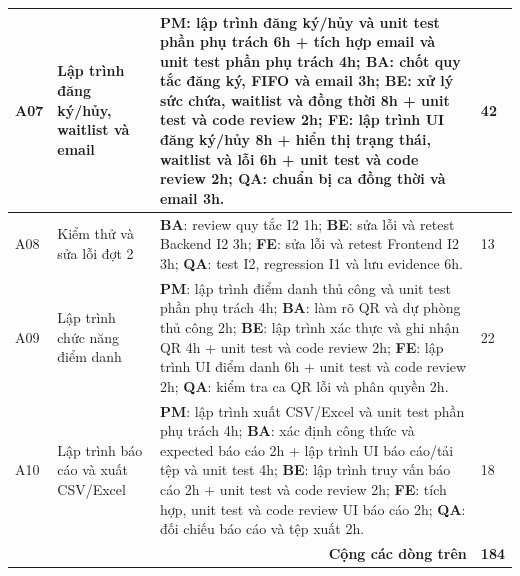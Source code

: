 \documentclass{article}
\begin{document}
\begin{landscape}
\begin{table}[H]
\begin{tabularx}{\linewidth}{|p{1.1cm}|p{5.3cm}|>{\raggedright\arraybackslash}X|p{1.25cm}|}
A07 & Lập trình đăng ký/hủy, waitlist và email & \textbf{PM}: lập trình đăng ký/hủy và unit test phần phụ trách 6h + tích hợp email và unit test phần phụ trách 4h; \textbf{BA}: chốt quy tắc đăng ký, FIFO và email 3h; \textbf{BE}: xử lý sức chứa, waitlist và đồng thời 8h + unit test và code review 2h; \textbf{FE}: lập trình UI đăng ký/hủy 8h + hiển thị trạng thái, waitlist và lỗi 6h + unit test và code review 2h; \textbf{QA}: chuẩn bị ca đồng thời và email 3h. & 42 \\ \hline
A08 & Kiểm thử và sửa lỗi đợt 2 & \textbf{BA}: review quy tắc I2 1h; \textbf{BE}: sửa lỗi và retest Backend I2 3h; \textbf{FE}: sửa lỗi và retest Frontend I2 3h; \textbf{QA}: test I2, regression I1 và lưu evidence 6h. & 13 \\ \hline
A09 & Lập trình chức năng điểm danh & \textbf{PM}: lập trình điểm danh thủ công và unit test phần phụ trách 4h; \textbf{BA}: làm rõ QR và dự phòng thủ công 2h; \textbf{BE}: lập trình xác thực và ghi nhận QR 4h + unit test và code review 2h; \textbf{FE}: lập trình UI điểm danh 6h + unit test và code review 2h; \textbf{QA}: kiểm tra ca QR lỗi và phân quyền 2h. & 22 \\ \hline
A10 & Lập trình báo cáo và xuất CSV/Excel & \textbf{PM}: lập trình xuất CSV/Excel và unit test phần phụ trách 4h; \textbf{BA}: xác định công thức và expected báo cáo 2h + lập trình UI báo cáo/tải tệp và unit test 4h; \textbf{BE}: lập trình truy vấn báo cáo 2h + unit test và code review 2h; \textbf{FE}: tích hợp, unit test và code review UI báo cáo 2h; \textbf{QA}: đối chiếu báo cáo và tệp xuất 2h. & 18 \\ \hline
\multicolumn{3}{|r|}{\textbf{Cộng các dòng trên}} & \textbf{184} \\ \hline
\end{tabularx}
\end{table}


\end{landscape}
\end{document}
